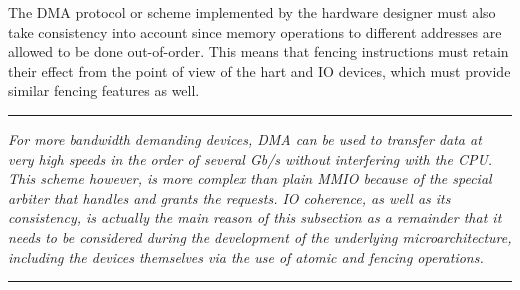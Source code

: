         The DMA protocol or scheme implemented by the hardware designer must also take consistency into account since memory operations to different addresses are allowed to be done out-of-order. This means that fencing instructions must retain their effect from the point of view of the hart and IO devices, which must provide similar fencing features as well.

    \par\noindent\rule{\textwidth}{0.4pt}
    \textit{For more bandwidth demanding devices, DMA can be used to transfer data at very high speeds in the order of several Gb/s without interfering with the CPU. This scheme however, is more complex than plain MMIO because of the special arbiter that handles and grants the requests. IO coherence, as well as its consistency, is actually the main reason of this subsection as a remainder that it needs to be considered during the development of the underlying microarchitecture, including the devices themselves via the use of atomic and fencing operations.}
    \par\noindent\rule{\textwidth}{0.4pt}